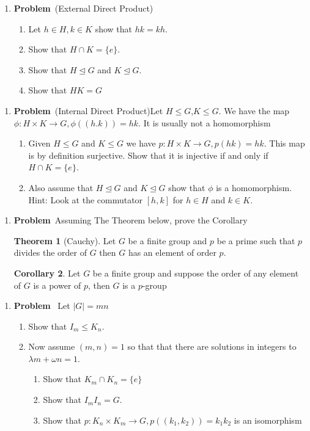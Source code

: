 \documentclass[12pt]{amsart}
\newcommand{\benu}{\begin{enumerate}}
\newcommand{\eenu}{\end{enumerate}}
\theoremstyle{definition}
\newtheorem{theorem}{Theorem}
\newcommand{\bet}{\begin{theorem}}
\newcommand{\et}{\end{theorem}}
\newtheorem{corollary}[theorem]{Corollary}
\newcommand{\bec}{\begin{corollary}}
\newcommand{\ec}{\end{corollary}}
\newcommand{\itep}{\item {\bfseries Problem}\ }
\begin{document}
\newpage

\begin{enumerate}[resume=p]
\itep (External Direct Product)
\benu
\item Let $h\in H,k\in K$ show that $hk=kh$.
\item Show that $H\cap K=\{e\}$.
\item Show that $H\unlhd G$ and $K\unlhd G$.
\item Show that $HK=G$
\eenu
\end{enumerate}

\newpage

\begin{enumerate}[resume=p]
\itep (Internal Direct Product)Let $H\leq G$,$K\leq G$. We have the map $\phi\colon H\times K\to G,\phi((h.k))=hk$. It is usually not a homomorphism
\benu
\item Given $H\leq G$ and $K\leq G$ we have $p\colon H\times K\to G,p(hk)=hk$. This map is by definition surjective. Show that it is injective if and only if $H\cap K=\{e\}$.
\item Also assume that $H\unlhd G$ and $K\unlhd G$ show that $\phi$ is a homomorphism. Hint: Look at the commutator $[h,k]$ for $h\in H$ and $k\in K$.
\eenu
\end{enumerate}

\newpage


\begin{enumerate}[resume=p]
\itep Assuming The Theorem below, prove the Corollary
\bet[Cauchy] \label{ct} Let $G$ be a finite group and $p$ be a prime such that $p$ divides the order of $G$ then $G$ has an element of order $p$.
\et
\bec \label{corpgroup} Let $G$ be a finite group and suppose the order of any element of $G$ is a power of $p$, then $G$ is a $p$-group
\ec
\end{enumerate} 

\newpage

\begin{enumerate}[resume=p]
\itep \label{startdecomp} Let $|G|=mn$ 
\benu
\item
 Show that $I_m\leq K_n$. 
 
\item Now assume $(m,n)=1$ so that  that there are solutions in integers to $\lambda m+\omega n=1$.
\benu
\item Show that $K_m\cap K_n=\{e\}$
\item Show that $I_mI_n=G$.
\item Show that $p:K_n\times K_m\to G, p((k_1,k_2))= k_1k_2$ is an isomorphism
\eenu
\eenu

\end{enumerate}
\end{document}
